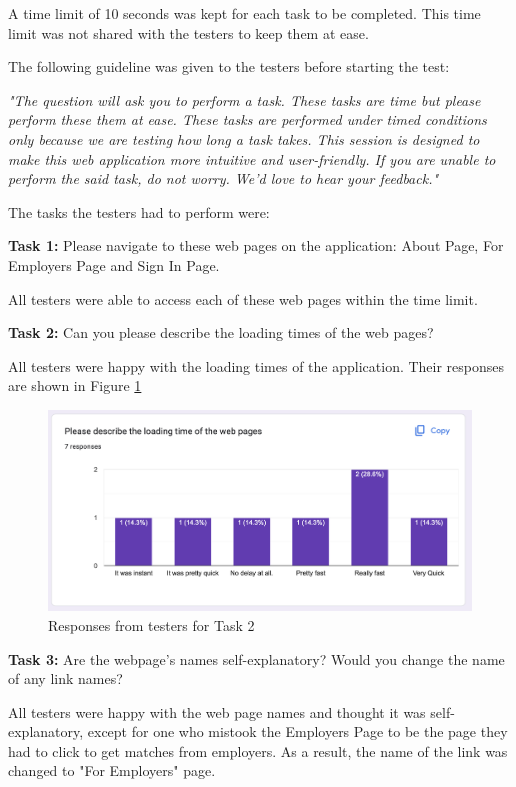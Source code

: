 A time limit of 10 seconds was kept for each task to be completed. This time limit was not shared with the testers to keep them at ease.

The following guideline was given to the testers before starting the test:

\textit{"The question will ask you to perform a task. These tasks are time but please perform these them at ease. These tasks are performed under timed conditions only because we are testing how long a task takes. This session is designed to make this web application more intuitive and user-friendly. If you are unable to perform the said task, do not worry. We'd love to hear your feedback."}

The tasks the testers had to perform were:

\textbf{Task 1:} Please navigate to these web pages on the application: About Page, For Employers Page and Sign In Page.

All testers were able to access each of these web pages within the time limit.

\textbf{Task 2:} Can you please describe the loading times of the web pages?

All testers were happy with the loading times of the application. Their responses are shown in Figure \ref{fig:usability-responses}

\begin{figure}
    \centering
    \includegraphics[width=140mm]{Figures/usability-responses}
    \caption{Responses from testers for Task 2}
    \label{fig:usability-responses}
\end{figure}

\textbf{Task 3:} Are the webpage's names self-explanatory? Would you change the name of any link names?

All testers were happy with the web page names and thought it was self-explanatory, except for one who mistook the Employers Page to be the page they had to click to get matches from employers. As a result, the name of the link was changed to "For Employers" page.

